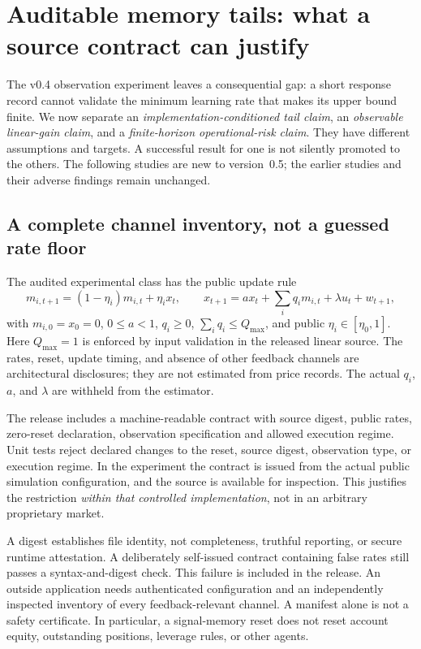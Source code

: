 \section{Auditable memory tails: what a source contract can justify}
\label{sec:audited_tails}
The v0.4 observation experiment leaves a consequential gap: a short response record cannot validate the minimum learning rate that makes its upper bound finite. We now separate an \emph{implementation-conditioned tail claim}, an \emph{observable linear-gain claim}, and a \emph{finite-horizon operational-risk claim}. They have different assumptions and targets. A successful result for one is not silently promoted to the others. The following studies are new to version~0.5; the earlier studies and their adverse findings remain unchanged.

\subsection{A complete channel inventory, not a guessed rate floor}
The audited experimental class has the public update rule
\begin{equation}
 m_{i,t+1}=(1-\eta_i)m_{i,t}+\eta_i x_t,\qquad
 x_{t+1}=a x_t+\sum_i q_i m_{i,t}+\lambda u_t+w_{t+1},
 \label{eq:audited_recursion}
\end{equation}
with $m_{i,0}=x_0=0$, $0\le a<1$, $q_i\ge0$, $\sum_iq_i\le Q_{\max}$, and public $\eta_i\in[\eta_0,1]$. Here $Q_{\max}=1$ is enforced by input validation in the released linear source. The rates, reset, update timing, and absence of other feedback channels are architectural disclosures; they are not estimated from price records. The actual $q_i$, $a$, and $\lambda$ are withheld from the estimator.

The release includes a machine-readable contract with source digest, public rates, zero-reset declaration, observation specification and allowed execution regime. Unit tests reject declared changes to the reset, source digest, observation type, or execution regime. In the experiment the contract is issued from the actual public simulation configuration, and the source is available for inspection. This justifies the restriction \emph{within that controlled implementation}, not in an arbitrary proprietary market.

A digest establishes file identity, not completeness, truthful reporting, or secure runtime attestation. A deliberately self-issued contract containing false rates still passes a syntax-and-digest check. This failure is included in the release. An outside application needs authenticated configuration and an independently inspected inventory of every feedback-relevant channel. A manifest alone is not a safety certificate. In particular, a signal-memory reset does not reset account equity, outstanding positions, leverage rules, or other agents.

